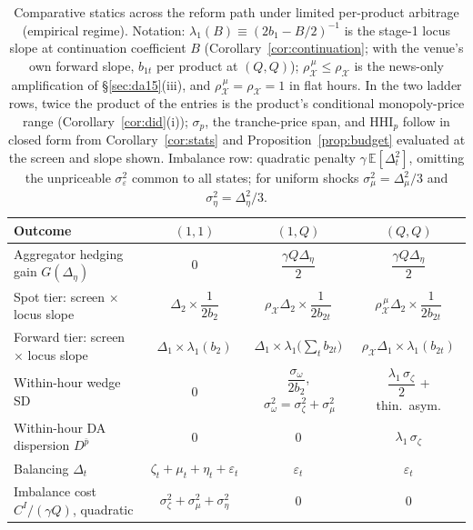\documentclass[11pt,a4paper]{article}
\theoremstyle{definition}
\theoremstyle{remark}
\theoremstyle{plain}
\begin{document}
\begin{table}[h]
\centering
\footnotesize
\caption{Comparative statics across the reform path under limited per-product arbitrage (empirical regime). Notation: $\lambda_1(B) \equiv (2 b_1 - B/2)^{-1}$ is the stage-1 locus slope at continuation coefficient $B$ (Corollary~\ref{cor:continuation}; with the venue's own forward slope, $b_{1t}$ per product at $(Q,Q)$); $\rho^{\,\mu}_{\mathcal X} \le \rho_{\mathcal X}$ is the news-only amplification of \S\ref{sec:da15}(iii), and $\rho^{\,\mu}_{\mathcal X} = \rho_{\mathcal X} = 1$ in flat hours. In the two ladder rows, twice the product of the entries is the product's conditional monopoly-price range (Corollary~\ref{cor:did}(i)); $\sigma_p$, the tranche-price span, and $\text{HHI}_p$ follow in closed form from Corollary~\ref{cor:stats} and Proposition~\ref{prop:budget} evaluated at the screen and slope shown. Imbalance row: quadratic penalty $\gamma\,\mathbb{E}[\Delta_t^2]$, omitting the unpriceable $\sigma_\varepsilon^2$ common to all states; for uniform shocks $\sigma_\mu^2 = \Delta_\mu^2/3$ and $\sigma_\eta^2 = \Delta_\eta^2/3$.}
\label{tab:comparative}
\begin{tabular}{p{4.6cm} c c c}
\toprule
Outcome & $(1,1)$ & $(1,Q)$ & $(Q,Q)$ \\
\midrule
Aggregator hedging gain $G(\Delta_\eta)$
 & $0$
 & $\dfrac{\gamma Q \Delta_\eta}{2}$
 & $\dfrac{\gamma Q \Delta_\eta}{2}$ \\
Spot tier: screen $\times$ locus slope
 & $\Delta_2 \times \dfrac{1}{2 b_2}$
 & $\rho_{\mathcal X}\Delta_2 \times \dfrac{1}{2 b_{2t}}$
 & $\rho^{\,\mu}_{\mathcal X}\Delta_2 \times \dfrac{1}{2 b_{2t}}$ \\
Forward tier: screen $\times$ locus slope
 & $\Delta_1 \times \lambda_1(b_2)$
 & $\Delta_1 \times \lambda_1\bigl(\textstyle\sum_t b_{2t}\bigr)$
 & $\rho_{\mathcal X}\Delta_1 \times \lambda_1(b_{2t})$ \\
Within-hour wedge SD
 & $0$
 & $\dfrac{\sigma_\omega}{2 b_2}$, $\ \sigma_\omega^2 = \sigma_\zeta^2+\sigma_\mu^2$
 & $\dfrac{\lambda_1\, \sigma_\zeta}{2}$ + thin.\ asym. \\
Within-hour DA dispersion $D^{\bar p}$
 & $0$
 & $0$
 & $\lambda_1\, \sigma_\zeta$ \\
Balancing $\Delta_t$
 & $\zeta_t+\mu_t+\eta_t+\varepsilon_t$
 & $\varepsilon_t$
 & $\varepsilon_t$ \\
Imbalance cost $C^I/(\gamma Q)$, quadratic
 & $\sigma_\zeta^2+\sigma_\mu^2+\sigma_\eta^2$
 & $0$
 & $0$ \\
\bottomrule
\end{tabular}
\end{table}
\end{document}
